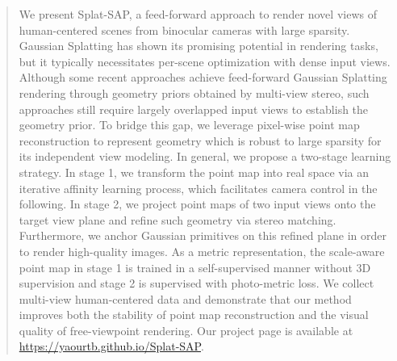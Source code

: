 \begin{abstract}
We present Splat-SAP, a feed-forward approach to render novel views of human-centered scenes from binocular cameras with large sparsity.
%
Gaussian Splatting has shown its promising potential in rendering tasks, but it typically necessitates per-scene optimization with dense input views.
%
Although some recent approaches achieve feed-forward Gaussian Splatting rendering through geometry priors obtained by multi-view stereo, such approaches still require largely overlapped input views to establish the geometry prior.
%
To bridge this gap, we leverage pixel-wise point map reconstruction to represent geometry which is robust to large sparsity for its independent view modeling.
%
In general, we propose a two-stage learning strategy.
%
In stage 1, we transform the point map into real space via an iterative affinity learning process, which facilitates camera control in the following.
%
In stage 2, we project point maps of two input views onto the target view plane and refine such geometry via stereo matching. 
%
Furthermore, we anchor Gaussian primitives on this refined plane in order to render high-quality images.
%
As a metric representation, the scale-aware point map in stage 1 is trained in a self-supervised manner without 3D supervision and stage 2 is supervised with photo-metric loss.
%
We collect multi-view human-centered data and demonstrate that our method improves both the stability of point map reconstruction and the visual quality of free-viewpoint rendering.
Our project page is available at {\small\url{https://yaourtb.github.io/Splat-SAP}}.
\end{abstract}